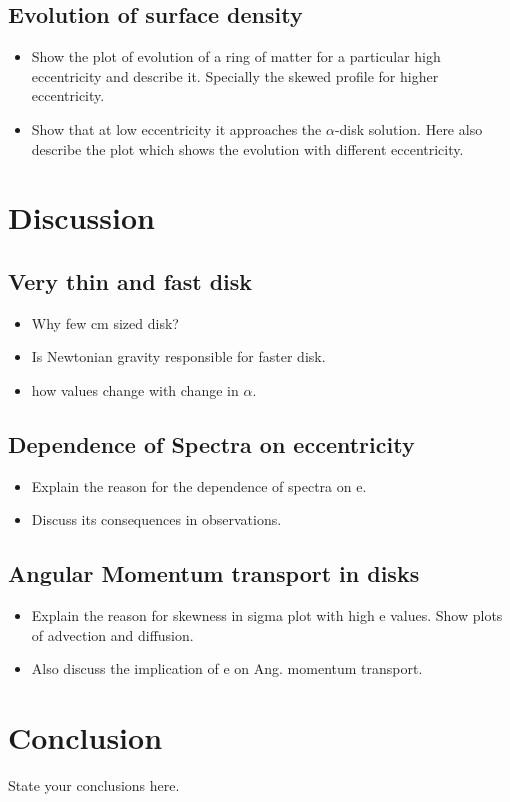 \documentclass[useAMS,usenatbib]{mn2e}
\begin{document}
\subsection{Evolution of surface density}
\begin{itemize}
\item Show the plot of evolution of a ring of matter for a particular high
  eccentricity and describe it. Specially the skewed profile for
  higher eccentricity. 
\item Show that at low eccentricity it approaches the $\alpha$-disk
  solution. Here also describe the plot which shows the evolution with
  different eccentricity. 
\end{itemize}

\section{Discussion}
\subsection{Very thin and fast disk}
\begin{itemize}
\item Why few cm sized disk?
\item Is Newtonian gravity responsible for faster disk. 
\item how values change with change in $\alpha$. 
\end{itemize}

\subsection{Dependence of Spectra on eccentricity}
\begin{itemize}
\item Explain the reason for the dependence of spectra on e. 
\item Discuss its consequences in observations.
\end{itemize}

\subsection{Angular Momentum transport in disks}
\begin{itemize}
\item Explain the reason for skewness in sigma plot with high e
  values. Show plots of advection and diffusion. 
\item Also discuss the implication of e on Ang. momentum transport. 
\end{itemize}

\section{Conclusion}
State your conclusions here. 






\label{lastpage}
\end{document}
